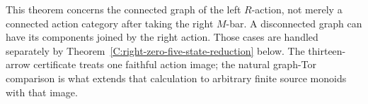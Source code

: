 \begin{remark}
\label{C:right-zero-five-connected-scope}
This theorem concerns the connected graph of the left $R$-action,
not merely a connected action category after taking the right
$M$-bar. A disconnected graph can have its components joined by
the right action. Those cases are handled separately by
Theorem~\ref{C:right-zero-five-state-reduction} below.
The thirteen-arrow certificate treats one faithful action image;
the natural graph-Tor comparison is what extends that calculation
to arbitrary finite source monoids with that image.
\end{remark}
